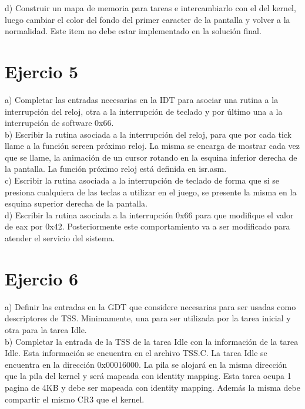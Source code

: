 \documentclass[a4paper]{article}
\begin{document}
{\large d)} Construir un mapa de memoria para tareas e intercambiarlo con el del kernel, luego cambiar
el color del fondo del primer caracter de la pantalla y volver a la normalidad. Este item
no debe estar implementado en la soluci\'on final.


\newpage
\section{Ejercio 5}

{\large a)} Completar las entradas necesarias en la IDT para asociar una rutina a la interrupci\'on del
reloj, otra a la interrupci\'on de teclado y por \'ultimo una a la interrupci\'on de software 0x66. \\

{\large b)} Escribir la rutina asociada a la interrupci\'on del reloj, para que por cada tick llame a la
funci\'on screen pr\'oximo reloj. La misma se encarga de mostrar cada vez que se llame, la
animaci\'on de un cursor rotando en la esquina inferior derecha de la pantalla. La funci\'on
pr\'oximo reloj est\'a definida en isr.asm. \\

{\large c)} Escribir la rutina asociada a la interrupci\'on de teclado de forma que si se presiona cualquiera
de las teclas a utilizar en el juego, se presente la misma en la esquina superior
derecha de la pantalla. \\

{\large d)} Escribir la rutina asociada a la interrupci\'on 0x66 para que modifique el valor de eax por
0x42. Posteriormente este comportamiento va a ser modificado para atender el servicio del
sistema.


\newpage
\section{Ejercio 6}
{\large a)} Definir las entradas en la GDT que considere necesarias para ser usadas como descriptores
de TSS. Minimamente, una para ser utilizada por la tarea inicial y otra para la tarea
Idle.\\

{\large b)} Completar la entrada de la TSS de la tarea Idle con la informaci\'on de la tarea Idle. Esta
informaci\'on se encuentra en el archivo TSS.C. La tarea Idle se encuentra en la direcci\'on
0x00016000. La pila se alojar\'a en la misma direcci\'on que la pila del kernel y ser\'a mapeada
con identity mapping. Esta tarea ocupa 1 pagina de 4KB y debe ser mapeada con identity
mapping. Adem\'as la misma debe compartir el mismo CR3 que el kernel. \\
\end{document}
